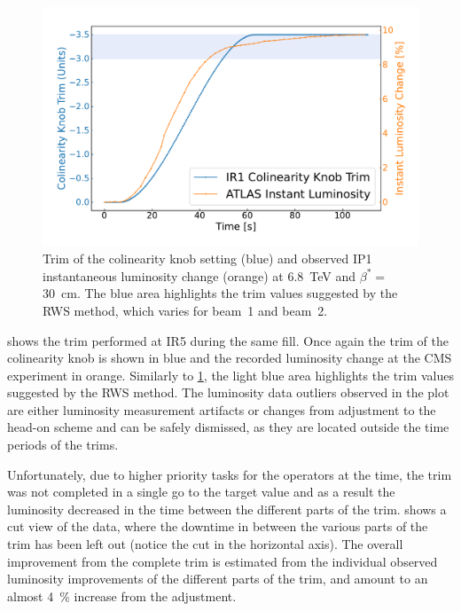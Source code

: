 \begin{figure}[!htb]
    \centering
    \includegraphics*[width=\textwidth]{Figures/IR_Coupling_Correction/corrections_trim_ir1.pdf}
    \caption{Trim of the colinearity knob setting (\textcolor{mplblue}{blue}) and observed IP\num{1} instantaneous luminosity change (\textcolor{mplorange}{orange}) at \qty{6.8}{\tera\electronvolt} and \(\beta^{\ast} = \) \qty{30}{cm}. The blue area highlights the trim values suggested by the RWS method, which varies for beam~\num{1} and beam~\num{2}.}
    \label{figure:corrections_trims_ir1}
\end{figure}

 shows the trim performed at IR\num{5} during the same fill.
Once again the trim of the colinearity knob is shown in \textcolor{mplblue}{blue} and the recorded luminosity change at the \acrshort{CMS} experiment in \textcolor{mplorange}{orange}.
Similarly to \cref{figure:corrections_trims_ir1}, the light blue area highlights the trim values suggested by the RWS method.
The luminosity data outliers observed in the plot are either luminosity measurement artifacts or changes from adjustment to the head-on scheme and can be safely dismissed, as they are located outside the time periods of the trims.

Unfortunately, due to higher priority tasks for the operators at the time, the trim was not completed in a single go to the target value and as a result the luminosity decreased in the time between the different parts of the trim.
 shows a cut view of the data, where the downtime in between the various parts of the trim has been left out (notice the cut in the horizontal axis).
The overall improvement from the complete trim is estimated from the individual observed luminosity improvements of the different parts of the trim, and amount to an almost \qty{4}{\percent} increase from the adjustment.

